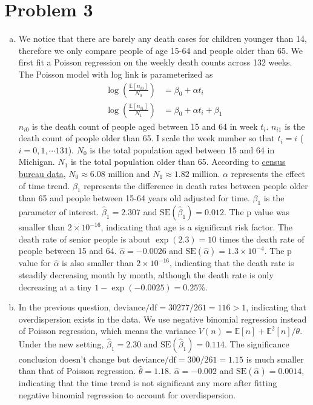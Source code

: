 \documentclass[12pt]{article}
\begin{document}
\section*{Problem 3}

\begin{enumerate}[(a)]
	\item We notice that there are barely any death cases for children younger than 14, therefore we only compare people of age 15-64 and people older than 65. We first fit a Poisson regression on the weekly death counts across 132 weeks. The Poisson model with log link is parameterized as
	\begin{align*}
		\log(\frac{\mathbb{E}[n_{i0}]}{N_{0}}) &= \beta_{0} + \alpha t_{i}\\
		\log(\frac{\mathbb{E}[n_{i1}]}{N_{1}}) &= \beta_{0} + \alpha t_{i} + \beta_{1}
	\end{align*}
	$n_{i0}$ is the death count of people aged between 15 and 64 in week $t_{i}$. $n_{i1}$ is the death count of people older than 65. I scale the week number so that $t_{i} = i$ ($i=0,1,\cdots 131$). $N_{0}$ is the total population aged between 15 and 64 in Michigan. $N_{1}$ is the total population older than 65. According to \href{https://www.census.gov/quickfacts/MI}{census bureau data}, $N_{0}\approx 6.08$ million and $N_{1}\approx 1.82$ million. $\alpha$ represents the effect of time trend.  $\beta_1$ represents the difference in death rates between people older than 65 and people between 15-64 years old adjusted for time. $\beta_{1}$ is the parameter of interest.  $\hat{\beta}_{1} = 2.307$ and $\text{SE}(\hat{\beta}_{1}) = 0.012$. The p value was smaller than $2\times 10^{-16}$, indicating that age is a significant risk factor. The death rate of senior people is about $\exp(2.3) = 10$ times the death rate of people between 15 and 64. $\hat{\alpha} = -0.0026$ and $\text{SE}(\hat{\alpha})=1.3\times 10^{-4}$. The p value for $\hat{\alpha}$ is also smaller than $2\times 10^{-16}$, indicating that the death rate is steadily decreasing month by month, although the death rate is only decreasing at a tiny $1-\exp(-0.0025)=0.25\%$.
	\item In the previous question, $\text{deviance}/\text{df}=30277/261=116 > 1$, indicating that overdispersion exists in the data. We use negative binomial regression instead of Poisson regression, which means the variance $V(n) = \mathbb{E}[n] +\mathbb{E}^{2}[n]/\theta$. Under the new setting, $\hat{\beta}_{1} = 2.30$ and  $\text{SE}(\hat{\beta}_1) = 0.114$. The significance conclusion doesn't change but $\text{deviance}/\text{df}=300/261=1.15$ is much smaller than that of Poisson regression. $\hat{\theta}=1.18$. $\hat{\alpha} = -0.002$ and $\text{SE}(\hat{\alpha}) = 0.0014$, indicating that the time trend is not significant any more after fitting negative binomial regression to account for overdispersion.
	

\end{enumerate}
\end{document}
